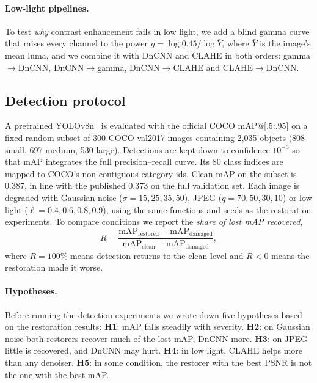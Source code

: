 \documentclass[11pt]{article}
\begin{document}
\paragraph{Low-light pipelines.} To test \emph{why} contrast enhancement fails in low light, we add a blind gamma curve that raises every channel to the power $g = \log 0.45 / \log \bar{Y}$, where $\bar{Y}$ is the image's mean luma, and we combine it with DnCNN and CLAHE in both orders: gamma$\to$DnCNN, DnCNN$\to$gamma, DnCNN$\to$CLAHE and CLAHE$\to$DnCNN.

\subsection{Detection protocol}
\label{sec:protocol}
A pretrained YOLOv8n~\citep{redmon2016yolo,jocher2023yolov8} is evaluated with the official COCO mAP@[.5:.95] on a fixed random subset of 300 COCO val2017 images containing 2{,}035 objects (808 small, 697 medium, 530 large). Detections are kept down to confidence $10^{-3}$ so that mAP integrates the full precision--recall curve. Its 80 class indices are mapped to COCO's non-contiguous category ids. Clean mAP on the subset is 0.387, in line with the published 0.373 on the full validation set. Each image is degraded with Gaussian noise ($\sigma = 15, 25, 35, 50$), JPEG ($q = 70, 50, 30, 10$) or low light ($\ell = 0.4, 0.6, 0.8, 0.9$), using the same functions and seeds as the restoration experiments. To compare conditions we report the \emph{share of lost mAP recovered},
\begin{equation}
R = \frac{\mathrm{mAP}_{\text{restored}} - \mathrm{mAP}_{\text{damaged}}}{\mathrm{mAP}_{\text{clean}} - \mathrm{mAP}_{\text{damaged}}},
\end{equation}
where $R=100\%$ means detection returns to the clean level and $R<0$ means the restoration made it worse.

\paragraph{Hypotheses.} Before running the detection experiments we wrote down five hypotheses based on the restoration results:
\textbf{H1}: mAP falls steadily with severity.
\textbf{H2}: on Gaussian noise both restorers recover much of the lost mAP, DnCNN more.
\textbf{H3}: on JPEG little is recovered, and DnCNN may hurt.
\textbf{H4}: in low light, CLAHE helps more than any denoiser.
\textbf{H5}: in some condition, the restorer with the best PSNR is not the one with the best mAP.
\end{document}
